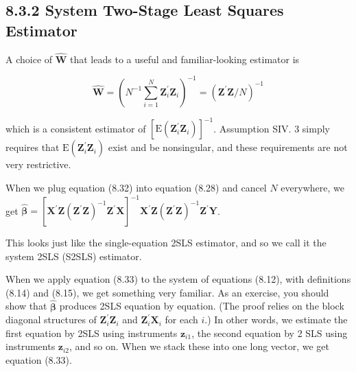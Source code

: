 \documentclass[10pt]{article}
\begin{document}
\subsection*{8.3.2 System Two-Stage Least Squares Estimator}
A choice of $\hat{\mathbf{W}}$ that leads to a useful and familiar-looking estimator is


\begin{equation*}
\hat{\mathbf{W}}=\left(N^{-1} \sum_{i=1}^{N} \mathbf{Z}_{i}^{\prime} \mathbf{Z}_{i}\right)^{-1}=\left(\mathbf{Z}^{\prime} \mathbf{Z} / N\right)^{-1} \tag{8.32}
\end{equation*}


which is a consistent estimator of $\left[\mathrm{E}\left(\mathbf{Z}_{i}^{\prime} \mathbf{Z}_{i}\right)\right]^{-1}$. Assumption SIV. 3 simply requires that $\mathrm{E}\left(\mathbf{Z}_{i}^{\prime} \mathbf{Z}_{i}\right)$ exist and be nonsingular, and these requirements are not very restrictive.

When we plug equation (8.32) into equation (8.28) and cancel $N$ everywhere, we get $\hat{\boldsymbol{\beta}}=\left[\mathbf{X}^{\prime} \mathbf{Z}\left(\mathbf{Z}^{\prime} \mathbf{Z}\right)^{-1} \mathbf{Z}^{\prime} \mathbf{X}\right]^{-1} \mathbf{X}^{\prime} \mathbf{Z}\left(\mathbf{Z}^{\prime} \mathbf{Z}\right)^{-1} \mathbf{Z}^{\prime} \mathbf{Y}$.

This looks just like the single-equation 2SLS estimator, and so we call it the system 2SLS (S2SLS) estimator.

When we apply equation (8.33) to the system of equations (8.12), with definitions (8.14) and (8.15), we get something very familiar. As an exercise, you should show that $\hat{\boldsymbol{\beta}}$ produces 2SLS equation by equation. (The proof relies on the block diagonal structures of $\mathbf{Z}_{i}^{\prime} \mathbf{Z}_{i}$ and $\mathbf{Z}_{i}^{\prime} \mathbf{X}_{i}$ for each $i$.) In other words, we estimate the first equation by 2SLS using instruments $\mathbf{z}_{i 1}$, the second equation by 2 SLS using instruments $\mathbf{z}_{i 2}$, and so on. When we stack these into one long vector, we get equation (8.33).
\end{document}
